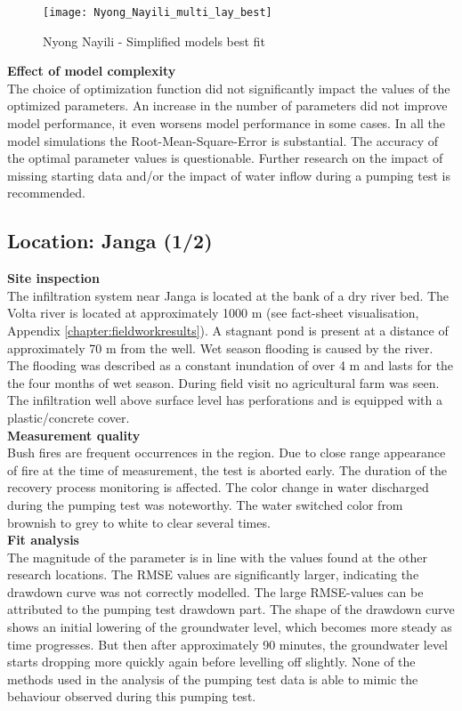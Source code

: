 \begin{figure}[h!]
 \centering
 \texttt{[image: Nyong\_Nayili\_multi\_lay\_best]}
 \captionsetup{justification=centering} 
 \caption{Nyong Nayili - Simplified models best fit}
 \label{fig:Nyong_Nayili_best}
\end{figure}

\textbf{Effect of model complexity} \\
The choice of optimization function did not significantly impact the values of the optimized parameters. An increase in the number of parameters did not improve model performance, it even worsens model performance in some cases. In all the model simulations the Root-Mean-Square-Error is substantial. The accuracy of the optimal parameter values is questionable. Further research on the impact of missing starting data and/or the impact of water inflow during a pumping test is recommended.  

\subsection{Location: Janga (1/2)}

\textbf{Site inspection} \\
The infiltration system near Janga is located at the bank of a dry river bed. The Volta river is located at approximately 1000 m (see fact-sheet visualisation, Appendix \ref{chapter:fieldworkresults}). A stagnant pond is present at a distance of approximately 70 m from the well. Wet season flooding is caused by the river. The flooding was described as a constant inundation of over 4 m and lasts for the the four months of wet season. During field visit no agricultural farm was seen. The infiltration well above surface level has perforations and is equipped with a plastic/concrete cover. \\ 

\textbf{Measurement quality} \\
Bush fires are frequent occurrences in the region. Due to close range appearance of fire at the time of measurement, the test is aborted early. The duration of the recovery process monitoring is affected. The color change in water discharged during the pumping test was noteworthy. The water switched color from brownish to grey to white to clear several times. \\

\textbf{Fit analysis} \\
The magnitude of the parameter is in line with the values found at the other research locations. The RMSE values are significantly larger, indicating the drawdown curve was not correctly modelled. The large RMSE-values can be attributed to the pumping test drawdown part. The shape of the drawdown curve shows an initial lowering of the groundwater level, which becomes more steady as time progresses. But then after approximately 90 minutes, the groundwater level starts dropping more quickly again before levelling off slightly.  None of the methods used in the analysis of the pumping test data is able to mimic the behaviour observed during this pumping test. \\

